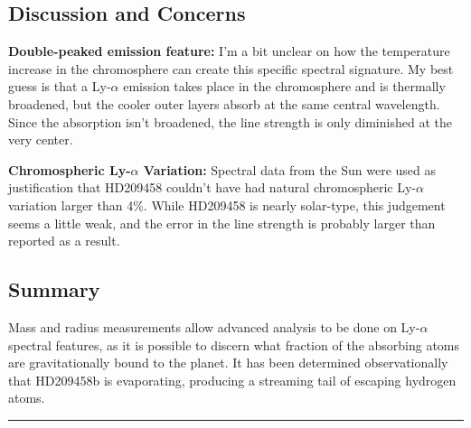 \documentclass[onecolumn]{aastex63}
\begin{document}

\subsection{Discussion and Concerns}
\textbf{Double-peaked emission feature:} I'm a bit unclear on how the temperature increase in the chromosphere can create this specific spectral signature. My best guess is that a Ly-$\alpha$ emission takes place in the chromosphere and is thermally broadened, but the cooler outer layers absorb at the same central wavelength. Since the absorption isn't broadened, the line strength is only diminished at the very center.

\textbf{Chromospheric Ly-$\alpha$ Variation:} Spectral data from the Sun were used as justification that HD209458 couldn't have had natural chromospheric Ly-$\alpha$ variation larger than 4\%. While HD209458 is nearly solar-type, this judgement seems a little weak, and the error in the line strength is probably larger than reported as a result.


\subsection{Summary}

Mass and radius measurements allow advanced analysis to be done on Ly-$\alpha$ spectral features, as it is possible to discern what fraction of the absorbing atoms are gravitationally bound to the planet. It has been determined observationally that HD209458b is evaporating, producing a streaming tail of escaping hydrogen atoms.



\vspace{1cm}
\hrule
\vspace{1cm}
\end{document}

